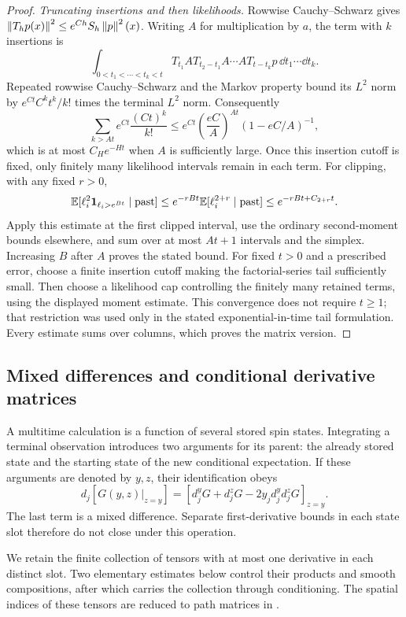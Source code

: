 \begin{proof}
\emph{Truncating insertions and then likelihoods.}
Rowwise Cauchy--Schwarz gives
$\left\lVert T_hp(x)\right\rVert^2\le e^{Ch}S_h\left\lVert p\right\rVert^2(x)$.
Writing $A$ for multiplication by $a$, the term with $k$ insertions is
\begin{equation}
 \int_{0<t_1<\cdots<t_k<t}
 T_{t_1}A T_{t_2-t_1}A\cdots A T_{t-t_k}p\,
 \dd t_1\cdots\dd t_k.
 \label{eq:path-Duhamel}
\end{equation}
Repeated rowwise Cauchy--Schwarz and the Markov property bound its
$L^2$ norm by $e^{Ct}C^kt^k/k!$ times the terminal $L^2$ norm.
Consequently
\[
 \sum_{k>At}e^{Ct}\frac{(Ct)^k}{k!}
 \le e^{Ct}\left(\frac{eC}{A}\right)^{At}
                   (1-eC/A)^{-1},
\]
which is at most $C_He^{-Ht}$ when $A$ is sufficiently large.
Once this insertion cutoff is fixed, only finitely many likelihood
intervals remain in each term.  For clipping, with any fixed $r>0$,
\[
 \mathbb E[\ell_i^2\mathbf 1_{\ell_i>e^{Bt}}\mid\text{past}]
 \le e^{-rBt}\mathbb E[\ell_i^{2+r}\mid\text{past}]
 \le e^{-rBt+C_{2+r}t}.
\]
Apply this estimate at the first clipped interval, use the ordinary
second-moment bounds elsewhere, and sum over at most $At+1$ intervals
and the simplex.  Increasing $B$ after $A$ proves the stated bound.
For fixed $t>0$ and a prescribed error, choose a finite insertion
cutoff making the factorial-series tail sufficiently small.  Then choose
a likelihood cap controlling the finitely many retained terms, using
the displayed moment estimate.  This convergence does not require
$t\ge1$; that restriction was used only in the stated exponential-in-time
tail formulation.  Every estimate sums over columns, which proves the
matrix version.
\end{proof}

\subsection{Mixed differences and conditional derivative matrices}

A multitime calculation is a function of several stored spin states.
Integrating a terminal observation introduces two arguments for its
parent: the already stored state and the starting state of the new
conditional expectation.  If these arguments are denoted by $y,z$,
their identification obeys
\[
 d_j[G(y,z)|_{z=y}]
 =\left[d_j^yG+d_j^zG-2y_jd_j^yd_j^zG\right]_{z=y}.
\]
The last term is a mixed difference.  Separate first-derivative bounds
in each state slot therefore do not close under this operation.

We retain the finite collection of tensors with at most one derivative
in each distinct slot.  Two elementary estimates below control their
products and smooth compositions, after which
 carries the collection through
conditioning.  The spatial indices of these tensors are reduced to
path matrices in .

